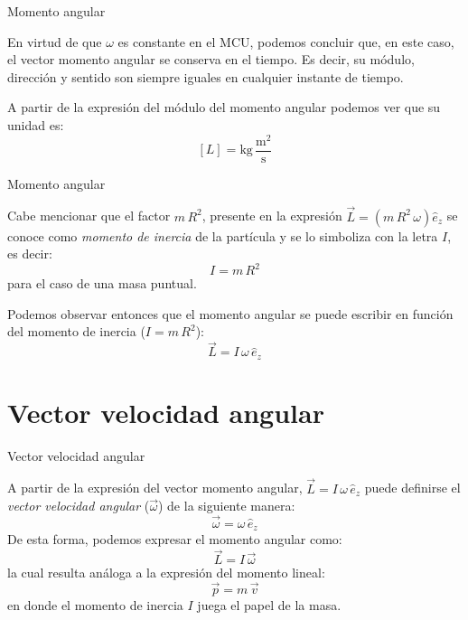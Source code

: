 \documentclass[11pt,handout,aspectratio=1610]{beamer}
\begin{document}
\begin{frame}{Momento angular}

    En virtud de que $\omega$ es constante en el MCU, podemos concluir que, en este caso, el vector momento angular se conserva en el tiempo. Es decir, su módulo, dirección y sentido son siempre iguales en cualquier instante de tiempo.

    \vspace{11pt}

    A partir de la expresión del módulo del momento angular podemos ver que su unidad es: $$ \left[L\right] = \text{kg} \, \frac{\text{m}^2}{\text{s}}$$
    
\end{frame}

\begin{frame}{Momento angular}

    Cabe mencionar que el factor $m \, R^2$, presente en la expresión $\vec{L} = \left(m \, R^2 \, \omega\right) \hat{e}_z$ se conoce como \emph{momento de inercia} de la partícula y se lo simboliza con la letra $I$, es decir: $$I = m \, R^2$$ para el caso de una masa puntual.

    \vspace{11pt}

    Podemos observar entonces que el momento angular se puede escribir en función del momento de inercia ($I = m \, R^2$): $$ \vec{L} = I \, \omega \, \hat{e}_z$$

\end{frame}

\section{Vector velocidad angular}

\begin{frame}{Vector velocidad angular}

    A partir de la expresión del vector momento angular, $\vec{L} = I \, \omega \, \hat{e}_z$ puede definirse el \emph{vector velocidad angular} ($\vec{\omega}$) de la siguiente manera: $$\vec{\omega} = \omega \, \hat{e}_z$$ De esta forma, podemos expresar el momento angular como: $$\vec{L} = I \, \vec{\omega}$$ la cual resulta análoga a la expresión del momento lineal: $$\vec{p} = m \, \vec{v}$$ en donde el momento de inercia $I$ juega el papel de la masa.

\end{frame}
\end{document}
